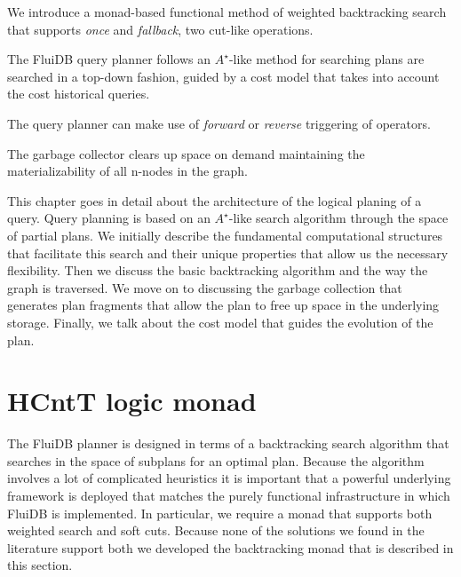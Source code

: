 
\begin{summary}
\item We introduce a monad-based functional method of weighted
  backtracking search that supports \emph{once} and \emph{fallback},
  two cut-like operations.
\item The FluiDB query planner follows an \(A^{\star}\)-like method for
  searching plans are searched in a top-down fashion, guided by a
  cost model that takes into account the cost historical queries.
\item The query planner can make use of \emph{forward} or
  \emph{reverse} triggering of operators.
\item The garbage collector clears up space on demand maintaining the
  materializability of all n-nodes in the graph.
\end{summary}

This chapter goes in detail about the architecture of the logical
planing of a query. Query planning is based on an \(A^{\star}\)-like
search algorithm through the space of partial plans. We initially
describe the fundamental computational structures that facilitate this
search and their unique properties that allow us the necessary
flexibility. Then we discuss the basic backtracking algorithm and the
way the graph is traversed. We move on to discussing the garbage
collection that generates plan fragments that allow the plan to free
up space in the underlying storage. Finally, we talk about the cost
model that guides the evolution of the plan.

\section{HCntT logic monad}

The FluiDB planner is designed in terms of a backtracking search
algorithm that searches in the space of subplans for an optimal
plan. Because the algorithm involves a lot of complicated heuristics
it is important that a powerful underlying framework is deployed that
matches the purely functional infrastructure in which FluiDB is
implemented.  In particular, we require a monad that supports both
weighted search and soft cuts. Because none of the solutions we found
in the literature support both we developed the 
backtracking monad that is described in this section.

